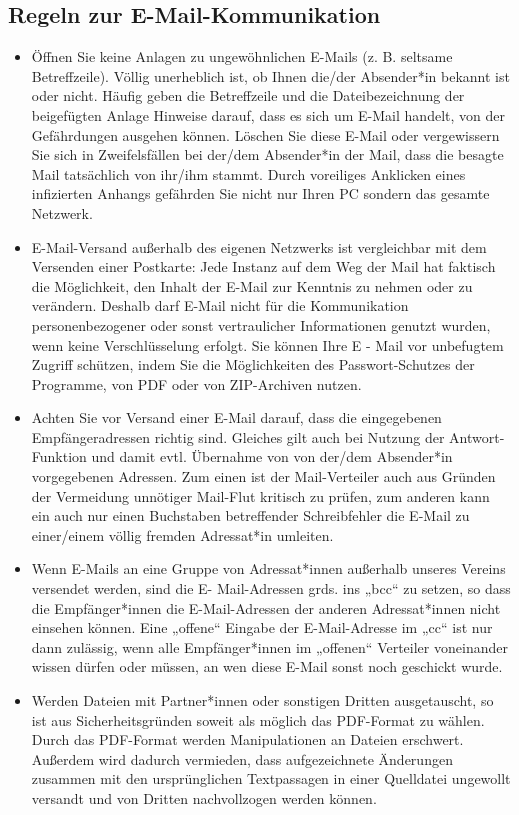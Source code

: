 \documentclass[a4paper, fontsize=11pt]{scrartcl}
\begin{document}
\subsection{Regeln zur E-Mail-Kommunikation}
\begin{itemize}
  \item Öffnen Sie keine Anlagen zu ungewöhnlichen E-Mails (z. B. seltsame Betreffzeile). Völlig unerheblich ist, ob Ihnen die/der Absender*in bekannt ist oder nicht. Häufig geben die Betreffzeile und die Dateibezeichnung der beigefügten Anlage Hinweise darauf, dass es sich um E-Mail handelt, von der Gefährdungen ausgehen können. Löschen Sie diese E-Mail oder vergewissern Sie sich in Zweifelsfällen bei der/dem Absender*in der Mail, dass die besagte Mail tatsächlich von ihr/ihm stammt. Durch voreiliges Anklicken eines infizierten Anhangs gefährden Sie nicht nur Ihren PC sondern das gesamte Netzwerk.
  \item E-Mail-Versand außerhalb des eigenen Netzwerks ist vergleichbar mit dem Versenden einer Postkarte: Jede Instanz auf dem Weg der Mail hat faktisch die Möglichkeit, den Inhalt der E-Mail zur Kenntnis zu nehmen oder zu verändern. Deshalb darf E-Mail nicht für die Kommunikation personenbezogener oder sonst vertraulicher Informationen genutzt wurden, wenn keine Verschlüsselung erfolgt. Sie können Ihre E - Mail vor unbefugtem Zugriff schützen, indem Sie die Möglichkeiten des Passwort-Schutzes der Programme, von PDF oder von ZIP-Archiven nutzen.
  \item Achten Sie vor Versand einer E-Mail darauf, dass die eingegebenen Empfängeradressen richtig sind. Gleiches gilt auch bei Nutzung der Antwort-Funktion und damit evtl. Übernahme von von der/dem Absender*in vorgegebenen Adressen. Zum einen ist der Mail-Verteiler auch aus Gründen der Vermeidung unnötiger Mail-Flut kritisch zu prüfen, zum anderen kann ein auch nur einen Buchstaben betreffender Schreibfehler die E-Mail zu einer/einem völlig fremden Adressat*in umleiten.
  \item Wenn E-Mails an eine Gruppe von Adressat*innen außerhalb unseres Vereins versendet werden, sind die E- Mail-Adressen grds. ins „bcc“ zu setzen, so dass die Empfänger*innen die E-Mail-Adressen der anderen Adressat*innen nicht einsehen können. Eine „offene“ Eingabe der E-Mail-Adresse im „cc“ ist nur dann zulässig, wenn alle Empfänger*innen im „offenen“ Verteiler voneinander wissen dürfen oder müssen, an wen diese E-Mail sonst noch geschickt wurde.
  \item Werden Dateien mit Partner*innen oder sonstigen Dritten ausgetauscht, so ist aus Sicherheitsgründen soweit als möglich das PDF-Format zu wählen. Durch das PDF-Format werden Manipulationen an Dateien erschwert. Außerdem wird dadurch vermieden, dass aufgezeichnete Änderungen zusammen mit den ursprünglichen Textpassagen in einer Quelldatei ungewollt versandt und von Dritten nachvollzogen werden können.
\end{itemize}
\end{document}
